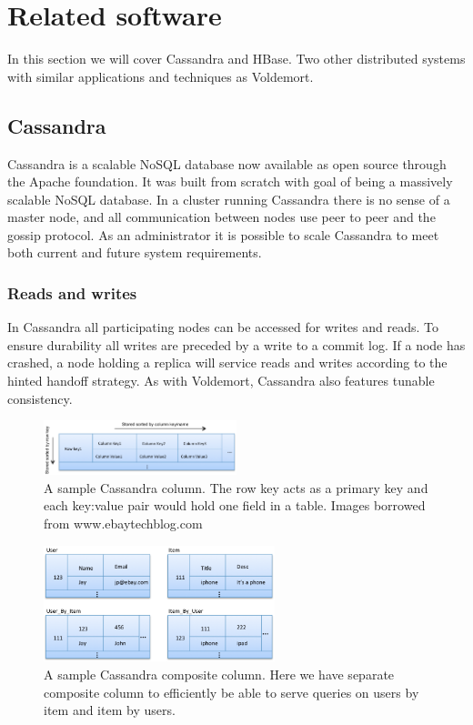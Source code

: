 \section{Related software}
\label{sec:related_software}
In this section we will cover Cassandra and HBase. Two other distributed systems with similar applications and techniques as Voldemort.

\subsection{Cassandra}
Cassandra is a scalable NoSQL database now available as open source through the Apache foundation. It was built from scratch with goal of being a massively scalable NoSQL database. In a cluster running Cassandra there is no sense of a master node, and all communication between nodes use peer to peer and the gossip protocol. As an administrator it is possible to scale Cassandra to meet both current and future system requirements. 

\subsubsection{Reads and writes}
In Cassandra all participating nodes can be accessed for writes and reads. To ensure durability all writes are preceded by a write to a commit log. If a node has crashed, a node holding a replica will service reads and writes according to the hinted handoff strategy. As with Voldemort, Cassandra also features tunable consistency. 

\begin{figure}[h]
    \centering
    \includegraphics[width=0.5\textwidth]{resources/cas_col.png}
    \caption{A sample Cassandra column. The row key acts as a primary key and each key:value pair would hold one field in a table. Images borrowed from www.ebaytechblog.com}
    \label{fig:sample_col}
\end{figure}

\begin{figure}[h]
    \centering
    \includegraphics[width=0.6\textwidth]{resources/cas_comp_col.png}
    \caption{A sample Cassandra composite column. Here we have separate composite column to efficiently be able to serve queries on users by item and item by users.}
    \label{fig:sample_comp_col}
\end{figure}

